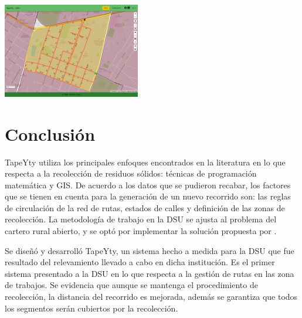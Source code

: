 \documentclass[a0,portrait, final]{a0poster}
\begin{document}
\begin{multicols}{2}
\begin{center}
    \centerline{\includegraphics[width=0.45\textwidth]{./figures/recorrido.png}}
\end{center}


\section*{Conclusi\'on}

TapeYty utiliza los principales enfoques encontrados en la literatura en lo que respecta a la recolección de residuos sólidos: técnicas de programación matemática y GIS. De acuerdo a los datos que se pudieron recabar, los factores que se tienen en cuenta para la generación de un nuevo recorrido son: las reglas de circulación de la red de rutas, estados de calles y definición de las zonas de recolección. La metodología de trabajo en la DSU se ajusta al problema del cartero rural abierto, y se optó por implementar la solución propuesta por \cite{Braier2017AnArgentina}.

Se diseñó y desarrolló TapeYty, un sistema hecho a medida para la DSU que fue resultado del relevamiento llevado a cabo en dicha institución. Es el primer sistema presentado a la DSU en lo que respecta a la gestión de rutas en las zona de trabajos. Se evidencia que aunque se mantenga el procedimiento de recolección, la distancia del recorrido es mejorada, además se garantiza que todos los segmentos serán cubiertos por la recolección.


\end{multicols}
\end{document}

